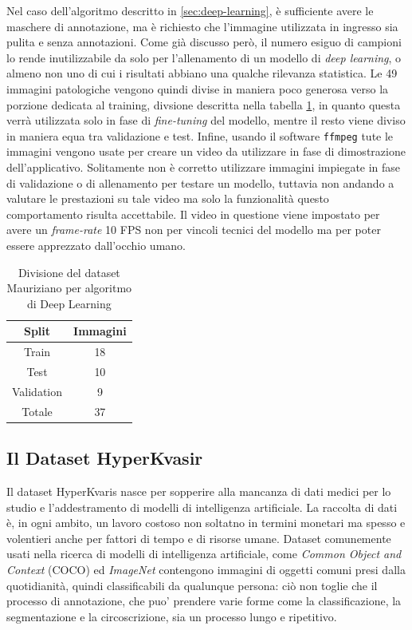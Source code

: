 Nel caso dell'algoritmo descritto in \ref{sec:deep-learning},
è sufficiente avere le maschere di annotazione, ma è richiesto
che l'immagine utilizzata in ingresso sia pulita e senza annotazioni.
Come già discusso però, il numero esiguo di campioni lo rende
inutilizzabile da solo per l'allenamento di un modello di
{\it deep learning}, o almeno non uno di cui i risultati abbiano
una qualche rilevanza statistica.
Le 49 immagini patologiche vengono quindi divise in maniera poco
generosa verso la porzione dedicata al training, divsione
descritta nella tabella \ref{tab:mauriziano-ii}, in quanto questa
verrà utilizzata solo in fase di {\it fine-tuning} del modello,
mentre il resto viene diviso in maniera equa tra validazione e test.
Infine, usando il software {\tt ffmpeg} tute le immagini vengono
usate per creare un video da utilizzare in fase di dimostrazione
dell'applicativo.
Solitamente non è corretto utilizzare immagini impiegate in fase
di validazione o di allenamento per testare un modello,
tuttavia non andando a valutare le prestazioni su tale video
ma solo la funzionalità questo comportamento risulta accettabile.
Il video in questione viene impostato per avere un {\it frame-rate}
10 FPS non per vincoli tecnici del modello ma per poter
essere apprezzato dall'occhio umano.

\begin{table}
    \center
    \begin{tabular}[h]{||c|c||}
        \hline
        Split & Immagini \\
        \hline
        Train & 18 \\
        Test & 10 \\
        Validation & 9 \\
        \hline
        Totale & 37 \\
        \hline
    \end{tabular}
    \caption{\label{tab:mauriziano-ii}Divisione del dataset Mauriziano per
    algoritmo di Deep Learning}
\end{table}



\subsection{\label{sec:dataset-hyperkvasir}Il Dataset HyperKvasir}

Il dataset HyperKvaris\cite{HyperKvasirDataset} nasce per sopperire
alla mancanza di dati medici per lo studio e l'addestramento
di modelli di intelligenza artificiale.
La raccolta di dati è, in ogni ambito, un lavoro costoso non 
soltatno in termini monetari ma spesso e volentieri anche
per fattori di tempo e di risorse umane.
Dataset comunemente usati nella ricerca di modelli di intelligenza
artificiale, come {\it Common Object and Context}\cite{cocodataset}
(COCO) ed {\it ImageNet} \cite{imagenet} contengono
immagini di oggetti comuni presi dalla quotidianità,
quindi classificabili da qualunque persona: ciò non toglie
che il processo di annotazione, che puo' prendere
varie forme come la classificazione, la segmentazione e la
circoscrizione, sia un processo lungo e ripetitivo.

